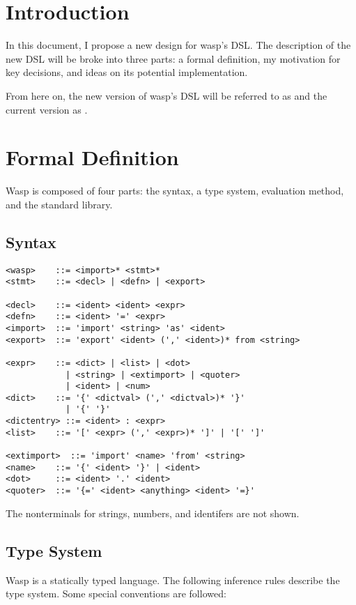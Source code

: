 \section{Introduction}

In this document, I propose a new design for wasp's DSL. The description
of the new DSL will be broke into three parts: a formal definition, my
motivation for key decisions, and ideas on its potential implementation.

From here on, the new version of wasp's DSL will be referred to as 
and the current version as .

\section{Formal Definition}

Wasp is composed of four parts: the syntax, a type system, evaluation method,
and the standard library.

\subsection{Syntax}

\begin{verbatim}
<wasp>    ::= <import>* <stmt>*
<stmt>    ::= <decl> | <defn> | <export>

<decl>    ::= <ident> <ident> <expr>
<defn>    ::= <ident> '=' <expr>
<import>  ::= 'import' <string> 'as' <ident>
<export>  ::= 'export' <ident> (',' <ident>)* from <string>

<expr>    ::= <dict> | <list> | <dot>
            | <string> | <extimport> | <quoter>
            | <ident> | <num>
<dict>    ::= '{' <dictval> (',' <dictval>)* '}'
            | '{' '}'
<dictentry> ::= <ident> : <expr>
<list>    ::= '[' <expr> (',' <expr>)* ']' | '[' ']'

<extimport>  ::= 'import' <name> 'from' <string>
<name>    ::= '{' <ident> '}' | <ident>
<dot>     ::= <ident> '.' <ident>
<quoter>  ::= '{=' <ident> <anything> <ident> '=}'
\end{verbatim}

The nonterminals for strings, numbers, and identifers are not shown.

\subsection{Type System}

Wasp is a statically typed language. The following inference rules describe the
type system. Some special conventions are followed:

